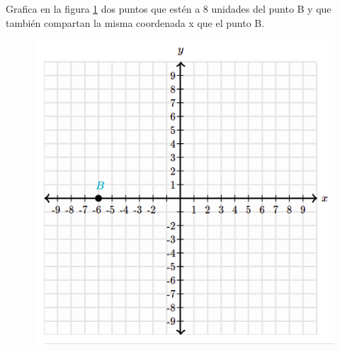 Grafica en la figura \ref{fig:planeB} dos puntos que estén a 8 unidades del punto B y que también compartan la misma coordenada x 
que el punto B.
\begin{figure}[H]
    \begin{center}
        \includegraphics[width=1\textwidth]{../images/planeB}
    \end{center}
    \caption{}
    \label{fig:planeB}
\end{figure}
